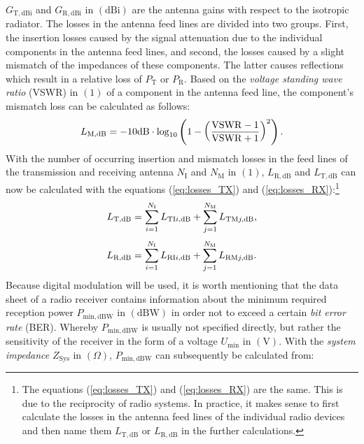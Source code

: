 $G_\mathrm{T,dBi}$ and $G_\mathrm{R,dBi}$ in $\left(\mathrm{dBi}\right)$ are the antenna gains with respect to the isotropic radiator. The losses in the antenna feed lines are divided into two groups. First, the insertion losses caused by the signal attenuation due to the individual components in the antenna feed lines, and second, the losses caused by a slight mismatch of the impedances of these components. The latter causes reflections which result in a relative loss of $P_\mathrm{T}$ or $P_\mathrm{R}$. Based on the \emph{voltage standing wave ratio} (VSWR) in $\left(\mathrm{1}\right)$ of a component in the antenna feed line, the component's mismatch loss can be calculated as follows:
\begin{equation} \label{eq:mismatch}
	\centering
	L_\mathrm{M,dB} = - 10\mathrm{dB} \cdot \log_{10} \left( 1 - \left( \dfrac{\mathrm{VSWR} - 1}{\mathrm{VSWR} + 1} \right)^2 \right)\text{.}
\end{equation}
With the number of occurring insertion and mismatch losses in the feed lines of the transmission and receiving antenna $N_\mathrm{I}$ and $N_\mathrm{M}$ in $\left(1\right)$, $L_\mathrm{R,dB}$ and $L_\mathrm{T,dB}$ can now be calculated with the equations (\ref{eq:losses_TX}) and (\ref{eq:losses_RX}):\footnote{The equations (\ref{eq:losses_TX}) and (\ref{eq:losses_RX}) are the same. This is due to the reciprocity of radio systems. In practice, it makes sense to first calculate the losses in the antenna feed lines of the individual radio devices and then name them $L_\mathrm{T,dB}$ or $L_\mathrm{R,dB}$ in the further calculations.}
\begin{equation} \label{eq:losses_TX}
	\centering
	L_\mathrm{T,dB} = \displaystyle\sum_{i=1}^{N_\mathrm{I}} L_{\mathrm{TI}i,\mathrm{dB}} + \displaystyle\sum_{j=1}^{N_\mathrm{M}} L_{\mathrm{TM}j,\mathrm{dB}}\text{,}
\end{equation}
\begin{equation} \label{eq:losses_RX}
	\centering
	L_\mathrm{R,dB} = \displaystyle\sum_{i=1}^{N_\mathrm{I}} L_{\mathrm{RI}i,\mathrm{dB}} + \displaystyle\sum_{j=1}^{N_\mathrm{M}} L_{\mathrm{RM}j,\mathrm{dB}}\text{.}
\end{equation}
Because digital modulation will be used, it is worth mentioning that the data sheet of a radio receiver contains information about the minimum required reception power $P_\mathrm{min,dBW}$ in $\left(\mathrm{dBW}\right)$ in order not to exceed a certain \emph{bit error rate} (BER). Whereby $P_\mathrm{min,dBW}$ is usually not specified directly, but rather the sensitivity of the receiver in the form of a voltage $U_\mathrm{min}$ in $\left(\mathrm{V}\right)$. With the \emph{system impedance} $Z_\mathrm{Sys}$ in $\left(\Omega\right)$, $P_\mathrm{min,dBW}$ can subsequently be calculated from:
